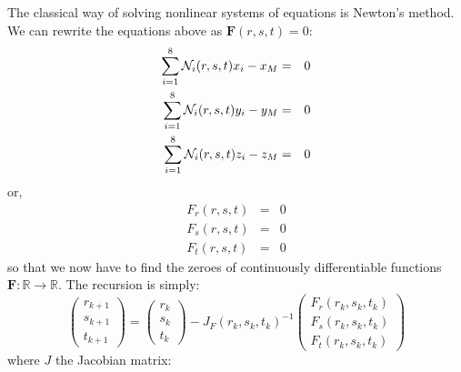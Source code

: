 The classical way of solving nonlinear systems of equations is Newton's method. 
We can rewrite the equations above as ${\bm F}(r,s,t)=0$:
\begin{eqnarray}
\sum_{i=1}^8 {\mathcal{N}}_i(r,s,t) x_i - x_M&=&0 \nonumber\\
\sum_{i=1}^8 {\mathcal{N}}_i(r,s,t) y_i - y_M&=&0 \nonumber\\
\sum_{i=1}^8 {\mathcal{N}}_i(r,s,t) z_i - z_M&=&0
\end{eqnarray}
or,
\begin{eqnarray}
F_r(r,s,t)&=&0 \nonumber\\
F_s(r,s,t)&=&0 \nonumber\\
F_t(r,s,t)&=&0 \nonumber
\end{eqnarray}
so that we now have to find the zeroes of continuously differentiable 
functions ${\bm F}:\mathbb{R} \rightarrow \mathbb{R}$.
The recursion is simply:
\[
\left(
\begin{array}{c}
r_{k+1} \\s_{k+1} \\ t_{k+1}
\end{array}
\right)
=
\left(
\begin{array}{c}
r_{k} \\s_{k} \\ t_{k}
\end{array}
\right)
- J_F(r_k,s_k,t_k) ^{-1} 
\left(
\begin{array}{c}
F_r(r_k,s_k,t_k) \\
F_s(r_k,s_k,t_k)\\
F_t(r_k,s_k,t_k)
\end{array}
\right)
\]
where $J$ the Jacobian matrix:
